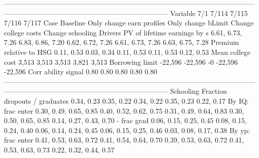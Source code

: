 -----------------------------------------------------------------------------------------------------------------------------------------------------------------------------------
                              Variable                          7/1                        7/114                    7/115                        7/116                        7/117
                                  Case                     Baseline    Only change earn profiles       Only change bLimit         Change college costs             Change schooling
                               Drivers                                                                                                                                             
          PV of lifetime earnings by s             6.61, 6.73, 7.26             6.83, 6.86, 7.20         6.62, 6.72, 7.26             6.61, 6.73, 7.26             6.63, 6.75, 7.28
               Premium relative to HSG                   0.11, 0.53                   0.03, 0.34               0.11, 0.53                   0.11, 0.53                   0.12, 0.53
                     Mean college cost                        3,513                        3,513                    3,513                        3,821                        3,513
                       Borrowing limit                      -22,596                      -22,596                       -0                      -22,596                      -22,596
                   Corr ability signal                         0.80                         0.80                     0.80                         0.80                         0.80
-----------------------------------------------------------------------------------------------------------------------------------------------------------------------------------
                             Schooling                                                                                                                                             
         Fraction dropouts / graduates                   0.34, 0.23                   0.35, 0.22               0.34, 0.22                   0.35, 0.23                   0.22, 0.17
                     By IQ: frac enter       0.30, 0.49, 0.65, 0.85       0.40, 0.52, 0.62, 0.75   0.31, 0.49, 0.64, 0.83       0.30, 0.50, 0.65, 0.85       0.14, 0.27, 0.43, 0.70
                           - frac grad       0.06, 0.15, 0.25, 0.45       0.08, 0.15, 0.24, 0.40   0.06, 0.14, 0.24, 0.45       0.06, 0.15, 0.25, 0.46       0.03, 0.08, 0.17, 0.38
                     By yp: frac enter       0.41, 0.53, 0.63, 0.72       0.41, 0.54, 0.64, 0.70   0.39, 0.53, 0.63, 0.72       0.41, 0.53, 0.63, 0.73       0.22, 0.32, 0.44, 0.57
